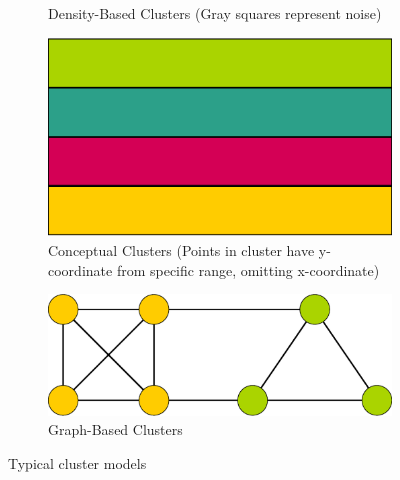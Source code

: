 \begin{figure}[h]
\begin{subfigure}{.49\textwidth}
  \caption{Density-Based Clusters (Gray squares represent noise)}
  \label{fig:densityClusters}
\end{subfigure}
\vspace*{0.5cm} 
\begin{subfigure}{.49\textwidth}
  \centering
  \includegraphics[width=.5\linewidth]{img/conceptualClusters.eps}
  \caption{Conceptual Clusters (Points in cluster have y-coordinate from specific range, omitting x-coordinate)}
  \label{fig:conceptualClusters}
\end{subfigure}
\begin{subfigure}{.49\textwidth}
  \centering
  \includegraphics[width=.5\linewidth]{img/graphClusters.eps}
  \caption{Graph-Based Clusters}
  \label{fig:graphClusters}
\end{subfigure}
\caption{Typical cluster models}
\end{figure}

